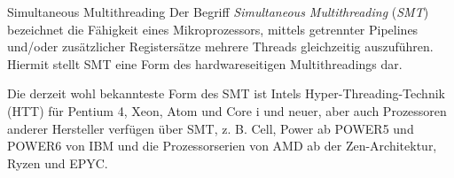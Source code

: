 \begin{bonus}{Simultaneous Multithreading}
    Der Begriff \emph{Simultaneous Multithreading} (\emph{SMT}) bezeichnet die Fähigkeit eines Mikroprozessors, mittels getrennter Pipelines und/oder zusätzlicher Registersätze mehrere Threads gleichzeitig auszuführen.
    Hiermit stellt SMT eine Form des hardwareseitigen Multithreadings dar.

    Die derzeit wohl bekannteste Form des SMT ist Intels Hyper-Threading-Technik (HTT) für Pentium 4, Xeon, Atom und Core i und neuer, aber auch Prozessoren anderer Hersteller verfügen über SMT, z. B. Cell, Power ab POWER5 und POWER6 von IBM und die Prozessorserien von AMD ab der Zen-Architektur, Ryzen und EPYC.
\end{bonus}